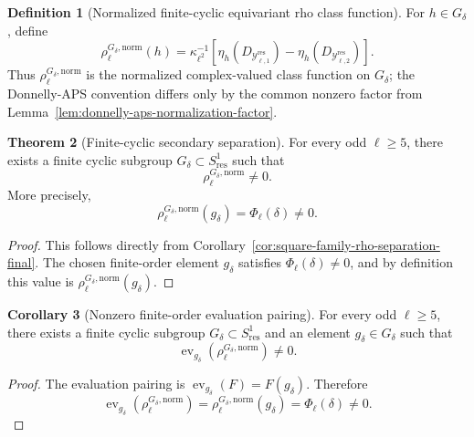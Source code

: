 \documentclass{article}
\theoremstyle{definition}
\newtheorem{theorem}{Theorem}[section]
\newtheorem{definition}[theorem]{Definition}
\newtheorem{corollary}[theorem]{Corollary}
\numberwithin{equation}{section}
\begin{document}
\begin{definition}[Normalized finite-cyclic equivariant rho class function]
For $h\in G_\delta$, define
\begin{equation}
\rho^{G_\delta,\text{norm}}_\ell(h)
=
\kappa_{\ell^2}^{-1}
\left[
\eta_h(D_{\mathcal Y^{\operatorname{res}}_{\ell,1}})
-
\eta_h(D_{\mathcal Y^{\operatorname{res}}_{\ell,2}})
\right].
\end{equation}
Thus $\rho^{G_\delta,\text{norm}}_\ell$ is the normalized complex-valued class function on $G_\delta$; the Donnelly-APS convention differs only by the common nonzero factor from Lemma~\ref{lem:donnelly-aps-normalization-factor}.
\end{definition}

\begin{theorem}[Finite-cyclic secondary separation]
\label{thm:finite-cyclic-secondary-separation}
For every odd $\ell\geq 5$, there exists a finite cyclic subgroup $G_\delta\subset S^1_{\text{res}}$ such that
\begin{equation}
\rho^{G_\delta,\text{norm}}_\ell\neq 0.
\end{equation}
More precisely,
\begin{equation}
\rho^{G_\delta,\text{norm}}_\ell(g_\delta)=\Phi_\ell(\delta)\neq 0.
\end{equation}
\end{theorem}

\begin{proof}
This follows directly from Corollary~\ref{cor:square-family-rho-separation-final}.  The chosen finite-order element $g_\delta$ satisfies $\Phi_\ell(\delta)\neq 0$, and by definition this value is $\rho^{G_\delta,\text{norm}}_\ell(g_\delta)$.
\end{proof}

\begin{corollary}[Nonzero finite-order evaluation pairing]
\label{cor:nonzero-finite-order-trace-pairing}
For every odd $\ell\geq 5$, there exists a finite cyclic subgroup $G_\delta\subset S^1_{\text{res}}$ and an element $g_\delta\in G_\delta$ such that
\begin{equation}
\operatorname{ev}_{g_\delta}(\rho^{G_\delta,\text{norm}}_\ell)\neq 0.
\end{equation}
\end{corollary}

\begin{proof}
The evaluation pairing is $\operatorname{ev}_{g_\delta}(F)=F(g_\delta)$.  Therefore
\begin{equation}
\operatorname{ev}_{g_\delta}(\rho^{G_\delta,\text{norm}}_\ell)=\rho^{G_\delta,\text{norm}}_\ell(g_\delta)=\Phi_\ell(\delta)\neq 0.
\end{equation}
\end{proof}
\end{document}
